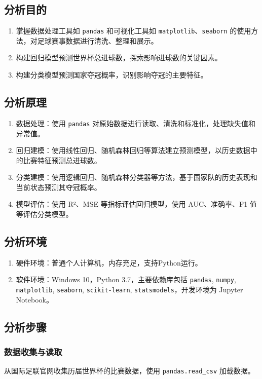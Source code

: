 \documentclass[UTF8]{ctexart}
\begin{document}
\subsection{分析目的}
\begin{enumerate}
	\def\labelenumi{\arabic{enumi}.}
	\item
	掌握数据处理工具如 \texttt{pandas} 和可视化工具如 \texttt{matplotlib}、\texttt{seaborn} 的使用方法，对足球赛事数据进行清洗、整理和展示。
	\item
	构建回归模型预测世界杯总进球数，探索影响进球数的关键因素。
	\item
	构建分类模型预测国家夺冠概率，识别影响夺冠的主要特征。
\end{enumerate}

\subsection{分析原理}
\begin{enumerate}
	\def\labelenumi{\arabic{enumi}.}
	\item
	数据处理：使用 \texttt{pandas} 对原始数据进行读取、清洗和标准化，处理缺失值和异常值。
	\item
	回归建模：使用线性回归、随机森林回归等算法建立预测模型，以历史数据中的比赛特征预测总进球数。
	\item
	分类建模：使用逻辑回归、随机森林分类器等方法，基于国家队的历史表现和当前状态预测其夺冠概率。
	\item
	模型评估：使用 R²、MSE 等指标评估回归模型，使用 AUC、准确率、F1 值等评估分类模型。
\end{enumerate}

\subsection{分析环境}
\begin{enumerate}
	\def\labelenumi{\arabic{enumi}.}
	\item
	硬件环境：普通个人计算机，内存充足，支持Python运行。
	\item
	软件环境：Windows 10，Python 3.7，主要依赖库包括 \texttt{pandas}, \texttt{numpy}, \texttt{matplotlib}, \texttt{seaborn}, \texttt{scikit-learn}, \texttt{statsmodels}，开发环境为 Jupyter Notebook。
\end{enumerate}

\subsection{分析步骤}
\subsubsection{数据收集与读取}
从国际足联官网收集历届世界杯的比赛数据，使用 \texttt{pandas.read\_csv} 加载数据。
\end{document}
